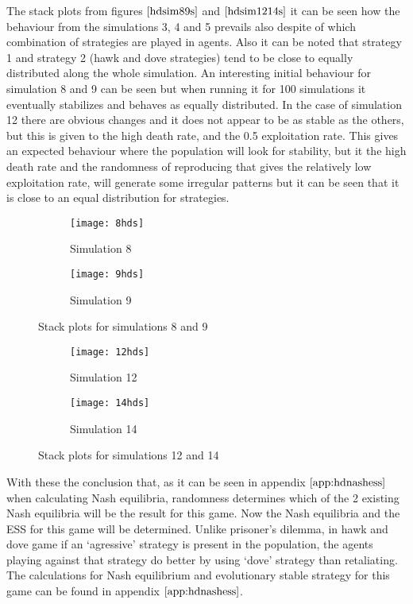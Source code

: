 The stack plots from figures $\ref{hdsim89s}$ and $\ref{hdsim1214s}$ it can be seen how the behaviour from the simulations 3, 4 and 5 prevails also despite of which combination of strategies are played in agents. Also it can be noted that strategy 1 and strategy 2 (hawk and dove strategies) tend to be close to equally distributed along the whole simulation. An interesting initial behaviour for simulation 8 and 9 can be seen but when running it for 100 simulations it eventually stabilizes and behaves as equally distributed. In the case of simulation 12 there are obvious changes and it does not appear to be as stable as the others, but this is given to the high death rate, and the 0.5 exploitation rate. This gives an expected behaviour where the population will look for stability, but it the high death rate and the randomness of reproducing that gives the relatively low exploitation rate, will generate some irregular patterns but it can be seen that it is close to an equal distribution for strategies.

\begin{figure}[H]       
    \centering
    \begin{subfigure}[b]{0.3\textwidth}
	\centering
	{\texttt{[image: 8hds]}}   
    	\caption{Simulation 8}
	\label{fig:hd8s}
    \end{subfigure}
    \hfill
    \begin{subfigure}[b]{0.3\textwidth}
	\centering
	{\texttt{[image: 9hds]}}   
    	\caption{Simulation 9}
	\label{fig:hd9s}
    \end{subfigure}
   \caption{Stack plots for simulations 8 and 9}
    \label{hdsim89s}
\end{figure}

\begin{figure}[H]       
    \centering
    \begin{subfigure}[b]{0.3\textwidth}
	\centering
	{\texttt{[image: 12hds]}}   
    	\caption{Simulation 12}
	\label{fig:hd12s}
    \end{subfigure}
    \hfill
    \begin{subfigure}[b]{0.3\textwidth}
	\centering
	{\texttt{[image: 14hds]}}   
    	\caption{Simulation 14}
	\label{fig:hd14s}
    \end{subfigure}
   \caption{Stack plots for simulations 12 and 14}
    \label{hdsim1214s}
\end{figure}

With these the conclusion that, as it can be seen in appendix $\ref{app:hdnashess}$ when calculating Nash equilibria, randomness determines which of the 2 existing Nash equilibria will be the result for this game. Now the Nash equilibria and the ESS for this game will be determined.  Unlike prisoner's dilemma, in hawk and dove game if an `agressive' strategy is present in the population, the agents playing against that strategy do better by using `dove' strategy than retaliating.
The calculations for Nash equilibrium and evolutionary stable strategy for this game can be found in appendix $\ref{app:hdnashess}$.


